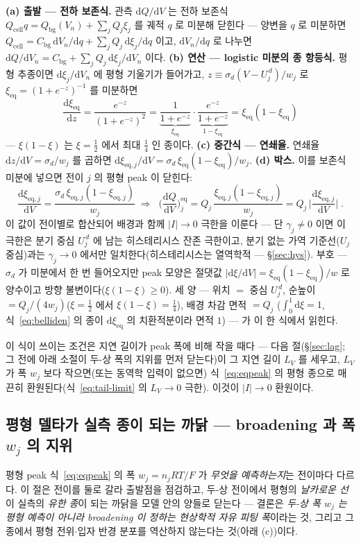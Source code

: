 \documentclass[11pt,a4paper]{article}
\newcommand{\dd}{\mathrm{d}}
\newcommand{\eq}{\mathrm{eq}}
\newcommand{\cell}{\mathrm{cell}}
\newcommand{\bg}{\mathrm{bg}}
\begin{document}
\textbf{(a) 출발 — 전하 보존식.} 관측 $\dd Q/\dd V$ 는 전하 보존식 $Q_\cell q=Q_\bg(V_n)+\sum_jQ_j\xi_j$ 를 궤적
$q$ 로 미분해 닫힌다 — 양변을 $q$ 로 미분하면 $Q_\cell=C_\bg\,\dd V_n/\dd q+\sum_jQ_j\,\dd\xi_j/\dd q$ 이고,
$\dd V_n/\dd q$ 로 나누면 $\dd Q/\dd V_n=C_\bg+\sum_jQ_j\,\dd\xi_j/\dd V_n$ 이다. \textbf{(b) 연산 — logistic
미분의 종 항등식.} 평형 추종이면 $\dd\xi_j/\dd V_n$ 에 평형 기울기가 들어가고, $z\equiv\sigma_d(V-U_j^{\,d})/w_j$ 로
$\xi_\eq=(1+e^{-z})^{-1}$ 를 미분하면
\begin{equation}
\frac{\dd\xi_\eq}{\dd z}=\frac{e^{-z}}{(1+e^{-z})^2}
=\underbrace{\frac{1}{1+e^{-z}}}_{\xi_\eq}\cdot\underbrace{\frac{e^{-z}}{1+e^{-z}}}_{1-\xi_\eq}
=\xi_\eq(1-\xi_\eq)
\label{eq:belliden}
\end{equation}
— $\xi(1-\xi)$ 는 $\xi=\tfrac12$ 에서 최대 $\tfrac14$ 인 종이다. \textbf{(c) 중간식 — 연쇄율.} 연쇄율
$\dd z/\dd V=\sigma_d/w_j$ 를 곱하면 $\dd\xi_{\eq,j}/\dd V=\sigma_d\,\xi_\eq(1-\xi_\eq)/w_j$. \textbf{(d) 박스.}
이를 보존식 미분에 넣으면 전이 $j$ 의 평형 peak 이 닫힌다:
\begin{equation}
\frac{\dd\xi_{\eq,j}}{\dd V}=\frac{\sigma_d\,\xi_{\eq,j}(1-\xi_{\eq,j})}{w_j}
\;\Longrightarrow\;
\boxed{\;\Big(\frac{\dd Q}{\dd V}\Big)^\eq_j
=Q_j\,\frac{\xi_{\eq,j}(1-\xi_{\eq,j})}{w_j}
=Q_j\,\Big|\frac{\dd\xi_{\eq,j}}{\dd V}\Big|\;.}
\label{eq:eqpeak}
\end{equation}
이 값이 전이별로 합산되어 배경과 함께 $|I|\to0$ 극한을 이룬다 --- 단 $\gamma_j\ne0$ 이면 이 극한은 분기
중심 $U_j^{\,d}$ 에 남는 히스테리시스 잔존 극한이고, 분기 없는 가역 기준선($U_j$ 중심)과는
$\gamma_j\to0$ 에서만 일치한다(히스테리시스는 열역학적 — \S\ref{sec:hys}). 부호 — $\sigma_d$ 가 미분에서 한 번 들어오지만 peak 모양은
절댓값 $|\dd\xi/\dd V|=\xi_\eq(1-\xi_\eq)/w$ 로 양수이고 방향 불변이다($\xi(1-\xi)\ge0$). 세 양 — 위치 $=$ 중심
$U_j^{\,d}$, 순높이 $=Q_j/(4w_j)$($\xi=\tfrac12$ 에서 $\xi(1-\xi)=\tfrac14$), 배경 차감 면적 $=Q_j$
($\int_0^1\dd\xi=1$, 식~\eqref{eq:belliden} 의 종이 $\dd\xi_\eq$ 의 치환적분이라 면적 $1$) — 가 이 한 식에서 읽힌다.

이 식이 쓰이는 조건은 지연 길이가 peak 폭에 비해 작을 때다 --- 다음 절(\S\ref{sec:lag}; 그 전에 아래 소절이
두-상 폭의 지위를 먼저 닫는다)이 그 지연 길이 $L_V$ 를 세우고, $L_V$ 가 폭 $w_j$
보다 작으면(또는 동역학 입력이 없으면) 식~\eqref{eq:eqpeak} 의 평형 종으로 매끈히 환원된다(식~\eqref{eq:tail-limit} 의 $L_V\to0$ 극한). 이것이 $|I|\to0$ 환원이다.

\subsection{평형 델타가 실측 종이 되는 까닭 — broadening 과 폭 $w_j$ 의 지위}\label{sec:broadening}
평형 peak 식~\eqref{eq:eqpeak} 의 폭 $w_j=n_jRT/F$ 가 \emph{무엇을 예측하는지}는 전이마다 다르다. 이 절은
전이를 둘로 갈라 출발점을 점검하고, 두-상 전이에서 평형의 \emph{날카로운 선}이 실측의 \emph{유한 종}이 되는
까닭을 모델 안의 양들로 닫는다 — 결론은 \emph{두-상 폭 $w_j$ 는 평형 예측이 아니라 broadening 이 정하는
현상학적 자유 피팅 폭}이라는 것, 그리고 그 종에서 평형 전위$\cdot$입자 반경 분포를 역산하지 않는다는
것(아래 (c))이다.
\end{document}
